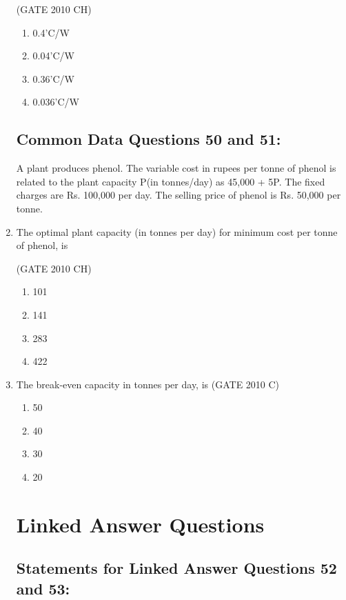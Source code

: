 \documentclass[journal,12pt,onecolumn]{exam}
\theoremstyle{remark}
\begin{document}
\begin{enumerate}
 \hfill{(GATE 2010 CH)}\\
 
  \begin{enumerate}
      \item 0.4'C/W
      \item 0.04'C/W
      \item 0.36'C/W
      \item 0.036'C/W
  \end{enumerate}

\subsection{Common Data Questions 50 and 51:}

A plant produces phenol. The variable cost in rupees per tonne of phenol is related to the plant capacity P(in tonnes/day) as 45,000 + 5P. The fixed charges are Rs. 100,000 per day. The selling price of phenol is Rs. 50,000 per tonne.\\
\item 
 The optimal plant capacity (in tonnes per day) for minimum cost per tonne of phenol, is
   
 \hfill{(GATE 2010 CH)}\\

\begin{enumerate}
    \item 101
    \item 141
    \item 283
    \item 422
\end{enumerate}
\item 
 The break-even capacity in tonnes per day, is
\hfill{(GATE 2010 C)}\\

\begin{enumerate}
    \item 50
    \item 40
    \item 30
    \item 20
    
\end{enumerate}

\section{Linked Answer Questions }
  \subsection{ Statements for Linked Answer Questions 52 and 53:} 


\end{enumerate}
\end{document}
